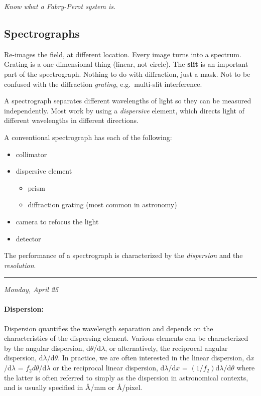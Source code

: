 \documentclass[12pt]{article}
\newcommand{\mynotes}[1]{\textcolor{myBlue}{#1}}
\newcommand{\test}[1]{%
    \begin{center}
        {\parbox{0.9\textwidth}{\textit{\small#1}}}
    \end{center}}
\newcommand{\mydate}[1]{
    \begin{flushright}
        \rule{\textwidth}{0.4pt} %
        \footnotesize\hfill\textit{#1}
    \end{flushright}}
\begin{document}
\test{Know what a Fabry-Perot system is.}

\subsection{Spectrographs}
\mynotes{Re-images the field, at different location. Every image turns into
a spectrum. Grating is a one-dimensional thing (linear, not circle).
The \textbf{slit} is an important part of the spectrograph. Nothing
to do with diffraction, just a mask. Not to be confused with the
diffraction \emph{grating}, e.g.\ multi-slit interference.}

A spectrograph separates different wavelengths of light so they can be measured
independently. Most work by using a \textit{dispersive} element, which directs
light of different wavelengths in different directions.

A conventional spectrograph has each of the following:
\begin{itemize}
    \item collimator
    \item dispersive element
        \begin{itemize}
            \item prism
            \item diffraction grating (most common in astronomy)
        \end{itemize}
    \item camera to refocus the light
    \item detector
\end{itemize}
The performance of a spectrograph is characterized by the \textit{dispersion}
and the \textit{resolution}.

\mydate{Monday, April 25}

\paragraph{Dispersion:}
Dispersion quantifies the wavelength separation and
depends on the characteristics of the dispersing element. Various
elements can be characterized by the angular dispersion, d$\theta$/d$\lambda$,
or alternatively, the reciprocal angular dispersion, d$\lambda$/d$\theta$. In
practice, we are often interested in the linear dispersion, d$x$/d$\lambda$ =
$f_{2}d\theta$/d$\lambda$ or the reciprocal linear dispersion, d$\lambda$/d$x$
= $(1/f_{2})$d$\lambda$/d$\theta$ where the latter is often referred to
simply as the dispersion in astronomical contexts, and is usually specified in
\AA{}/mm or \AA{}/pixel.
\end{document}
